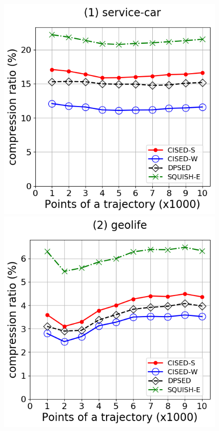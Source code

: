{\begin{figure}[tb!]
\centering
\includegraphics[scale = 0.2900]{Figures/Exp-CR-size-service.png}\hspace{1ex}
\includegraphics[scale = 0.2900]{Figures/Exp-CR-size-geolife.png}\hspace{1ex}

\end{figure}}
